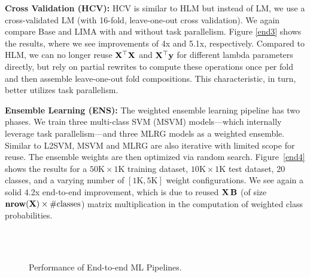 \textbf{Cross Validation (HCV):} HCV is similar to HLM but instead of LM, we use a cross-validated LM (with 16-fold, leave-one-out cross validation). We again compare Base and LIMA with and without task parallelism. Figure \ref{end3} shows the results, where we see improvements of 4x and 5.1x, respectively. Compared to HLM, we can no longer reuse $\mathbf{X}^{\top}\mathbf{X}$ and $\mathbf{X}^{\top}\mathbf{y}$ for different lambda parameters directly, but rely on partial rewrites to compute these operations once per fold and then assemble leave-one-out fold compositions. This characteristic, in turn, better utilizes task parallelism. 

\textbf{Ensemble Learning (ENS):} The weighted ensemble learning pipeline has two phases. We train three multi-class SVM (MSVM) models---which internally leverage task parallelism---and three MLRG models as a weighted ensemble. Similar to L2SVM, MSVM and MLRG are also iterative with limited scope for reuse. The ensemble weights are then optimized via random search. Figure~\ref{end4} shows the results for a $50\text{K} \times 1\text{K}$ training dataset, $10\text{K} \times 1\text{K}$ test dataset, 20 classes, and a varying number of $[1\text{K},5\text{K}]$ weight configurations. We see again a solid 4.2x end-to-end improvement, which is due to reused $\mathbf{X}\,\mathbf{B}$ (of size $\textbf{nrow}(\mathbf{X}) \times \text{\#classes}$) matrix multiplication in the computation of weighted class probabilities.

\begin{figure}[!t]
	\vspace{-0.05cm}
	\centering
	\hfill	
	~\vspace{-0.2cm}\\	
	\hfill
	~\vspace{-0.2cm}\\
	\hfill
	\vspace{-0.45cm}
	\caption{\label{fig:end2end1}Performance of End-to-end ML Pipelines.}
\end{figure}

